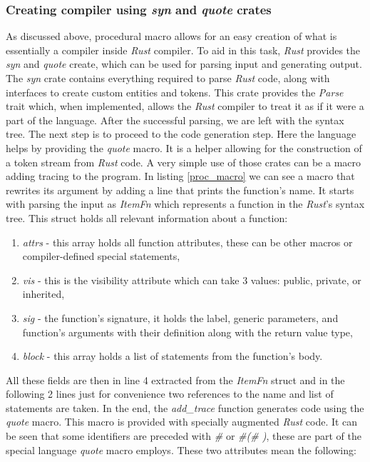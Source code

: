 \subsubsection{Creating compiler using \textit{syn} and \textit{quote} crates}
As discussed above, procedural macro allows for an easy creation of what is essentially a compiler inside \textit{Rust} compiler. To aid in this task, \textit{Rust} provides the \textit{syn} and \textit{quote} create, which can be used for parsing input and generating output. The \textit{syn} crate contains everything required to parse \textit{Rust} code, along with interfaces to create custom entities and tokens. This crate provides the \textit{Parse} trait which, when implemented, allows the \textit{Rust} compiler to treat it as if it were a part of the language. After the successful parsing, we are left with the syntax tree. The next step is to proceed to the code generation step. Here the language helps by providing the \textit{quote} macro. It is a helper allowing for the construction of a token stream from \textit{Rust} code. A very simple use of those crates can be a macro adding tracing to the program. In listing \ref{proc_macro} we can see a macro that rewrites its argument by adding a line that prints the function's name. It starts with parsing the input as \textit{ItemFn} which represents a function in the \textit{Rust}'s syntax tree. This struct holds all relevant information about a function:
\begin{enumerate}
    \item \textit{attrs} - this array holds all function attributes, these can be other macros or compiler-defined special statements,
    \item \textit{vis} - this is the visibility attribute which can take 3 values: public, private, or inherited,
    \item \textit{sig} - the function's signature, it holds the label, generic parameters, and function's arguments with their definition along with the return value type,
    \item \textit{block} - this array holds a list of statements from the function's body.
\end{enumerate}
All these fields are then in line 4 extracted from the \textit{ItemFn} struct and in the following 2 lines just for convenience two references to the name and list of statements are taken. In the end, the \textit{add\_trace} function generates code using the \textit{quote} macro. This macro is provided with specially augmented \textit{Rust} code. It can be seen that some identifiers are preceded with \textit{\#} or \textit{\#(\# )\*}, these are part of the special language \textit{quote} macro employs. These two attributes mean the following:
